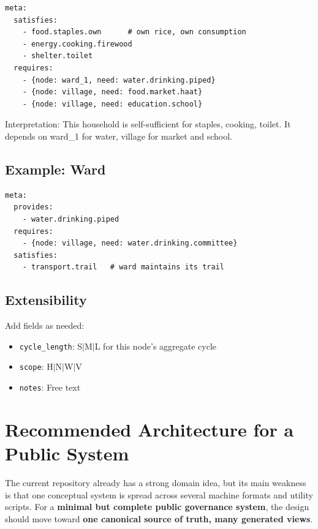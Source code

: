 \documentclass[11pt,a4paper]{article}
\begin{document}
\begin{verbatim}
meta:
  satisfies:
    - food.staples.own      # own rice, own consumption
    - energy.cooking.firewood
    - shelter.toilet
  requires:
    - {node: ward_1, need: water.drinking.piped}
    - {node: village, need: food.market.haat}
    - {node: village, need: education.school}
\end{verbatim}

Interpretation: This household is self-sufficient for staples, cooking, toilet. It depends on ward\_1 for water, village for market and school.

\subsection{Example: Ward}

\begin{verbatim}
meta:
  provides:
    - water.drinking.piped
  requires:
    - {node: village, need: water.drinking.committee}
  satisfies:
    - transport.trail   # ward maintains its trail
\end{verbatim}

\subsection{Extensibility}

Add fields as needed:
\begin{itemize}
    \item \texttt{cycle\_length}: S$|$M$|$L for this node's aggregate cycle
    \item \texttt{scope}: H$|$N$|$W$|$V
    \item \texttt{notes}: Free text
\end{itemize}

\section{Recommended Architecture for a Public System}

The current repository already has a strong domain idea, but its main weakness is that one conceptual system is spread across 
several machine formats and utility scripts. For a \textbf{minimal but complete public governance system}, the design should 
move toward \textbf{one canonical source of truth, many generated views}.
\end{document}
